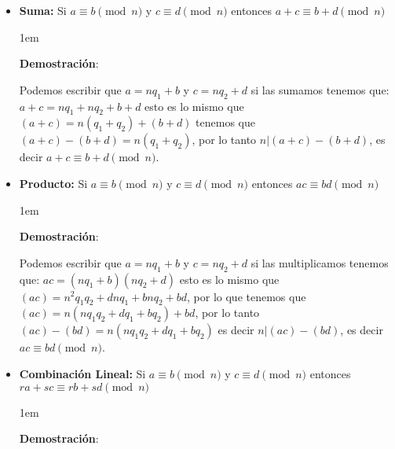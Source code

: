 \documentclass[12pt, fleqn]{report}                             %
\newenvironment{SmallIndentation}[1][0.75em]                    %
    {\begin{adjustwidth}{#1}{}\begin{footnotesize}}                 %
    {\end{footnotesize}\end{adjustwidth}}                           %
\begin{document}
            \begin{itemize}
                \item 
                    \textbf{Suma:} 
                    Si $a \equiv b \pmod{n}$ y $c \equiv d \pmod{n}$ entonces
                    $a+c \equiv b+d \pmod{n}$

                    \begin{SmallIndentation}[1em]
                        \textbf{Demostración}:

                        Podemos escribir que $a=nq_1+b$ y $c=nq_2+d$ si las sumamos tenemos que:
                        $a+c=nq_1 + nq_2 + b+d$ esto es lo mismo que $(a+c)=n(q_1+q_2)+(b+d)$ tenemos que
                        $(a+c) - (b+d) = n(q_1+q_2)$, por lo tanto $n|(a+c) - (b+d)$, es decir
                        $a+c \equiv b+d \pmod{n}$.

                    \end{SmallIndentation}

                \item 
                    \textbf{Producto:} 
                    Si $a \equiv b \pmod{n}$ y $c \equiv d \pmod{n}$ entonces
                    $ac \equiv bd \pmod{n}$

                    \begin{SmallIndentation}[1em]
                        \textbf{Demostración}:

                        Podemos escribir que $a=nq_1+b$ y $c=nq_2+d$ si las multiplicamos tenemos que:
                        $ac=(nq_1+b)(nq_2+d)$ esto es lo mismo que
                        $(ac)=n^2q_1q_2 + dnq_1 + bnq_2 + bd$, por lo que tenemos que
                        $(ac)=n(nq_1q_2+dq_1+bq_2) +bd$, por lo tanto $(ac) - (bd)=n(nq_1q_2+dq_1+bq_2)$
                        es decir $n|(ac) - (bd)$, es decir $ac \equiv bd \pmod{n}$.

                    \end{SmallIndentation}

                \item 
                    \textbf{Combinación Lineal:} 
                    Si $a \equiv b \pmod{n}$ y $c \equiv d \pmod{n}$ entonces
                    $ra + sc \equiv rb + sd \pmod{n}$

                    \begin{SmallIndentation}[1em]
                        \textbf{Demostración}:


\end{SmallIndentation}
\end{itemize}
\end{document}

